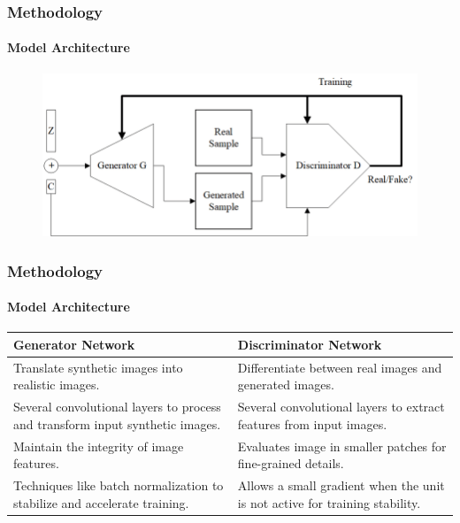 \documentclass[aspectratio=169, lecture, amberg]{OTHAWbeamer}
\begin{document}
\begin{frame}
    \frametitle{Methodology}
    \framesubtitle{Model Architecture}
    
    \begin{figure}
        \centering
        \includegraphics[width=1.0\linewidth]{GANS.png} %
        
    \end{figure}
\end{frame}

\begin{frame}
\frametitle{Methodology}
\framesubtitle{Model Architecture}
\begin{table}[ht]
    \centering
    \begin{tabular}{|p{}|p{}|}
        \hline
        \textbf{Generator Network} & \textbf{Discriminator Network} \\
        \hline
        
        Translate synthetic images into realistic images. & Differentiate between real images and generated images. \\
        \hline
        
        Several convolutional layers to process and transform input synthetic images. & Several convolutional layers to extract features from input images. \\
        \hline
        
        Maintain the integrity of image features. & Evaluates image in smaller patches for fine-grained details. \\
        \hline
        
        Techniques like batch normalization to stabilize and accelerate training. & Allows a small gradient when the unit is not active for training stability. \\
        \hline
    \end{tabular}
    \label{tab:gen_vs_disc}
    \end{table}

\end{frame}
\end{document}
